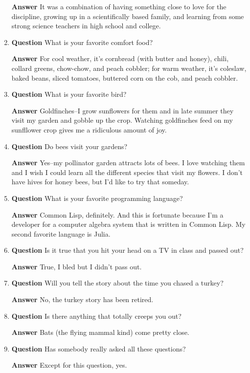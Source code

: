 \documentclass[12pt]{article}
\newcounter{ex}\setcounter{ex}{0}
\newcounter{dy}\setcounter{dy}{0}
\begin{document}
\begin{enumerate}
\textbf{Answer} It was a combination of having something close to love for the discipline, growing up in a scientifically based family, and learning from some strong science teachers in high school and college.


\item  \textbf{Question} What is your favorite comfort food?

  \textbf{Answer}  For cool weather, it's cornbread (with butter and honey), chili, collard greens, chow-chow, and peach cobbler; for warm weather, it's coleslaw, baked beans, sliced tomatoes, buttered corn on the cob, and peach cobbler.

  \item  \textbf{Question}  What is your favorite bird?
  
  \textbf{Answer} Goldfinches--I grow sunflowers for them and in late summer
  they visit my garden and gobble up the crop. Watching goldfinches feed on my sunfllower
  crop gives me a 
  ridiculous amount of joy.

  \item  \textbf{Question}  Do bees visit your gardens?
  
  \textbf{Answer} Yes--my pollinator garden attracts lots of bees. I love
  watching them and I wish I could learn all the different
  species that visit my flowers. I don't have hives for honey bees, but
  I'd like to try that someday.

\item   \textbf{Question}  What is your favorite programming language?

 \textbf{Answer}  Common Lisp, definitely. And this is fortunate because I'm a developer for a computer algebra system that is written in Common Lisp. My second favorite language is Julia.

\item   \textbf{Question} Is it true that you hit your head on a TV in class and 
passed out?

  \textbf{Answer} True, I bled but I didn't pass out.

\item   \textbf{Question} Will you tell the story about the time you chased a turkey?

 \textbf{Answer} No, the turkey story has been retired.


\item   \textbf{Question} Is there anything that totally creeps you out?

\textbf{Answer} Bats (the flying mammal kind) come pretty close.

\item \textbf{Question} Has somebody really asked all these questions?

\textbf{Answer}  Except for  this question, yes.
\end{enumerate}
\end{document}
